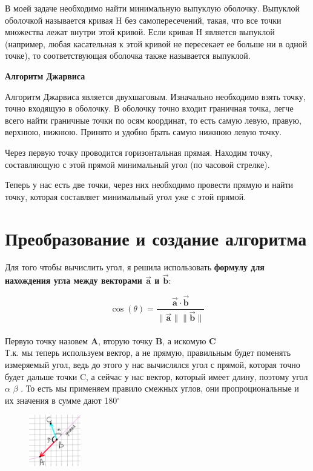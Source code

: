 \documentclass[a4paper]{article}
\begin{document}
\hspace{0.5cm} В моей задаче необходимо найти минимальную выпуклую оболочку. Выпуклой оболочкой называется кривая H без самопересечений, такая, что все точки множества лежат внутри этой кривой. Если кривая H является выпуклой (например, любая касательная к этой кривой не пересекает ее больше ни в одной точке), то соответствующая оболочка также называется выпуклой.

\textbf{Алгоритм Джарвиса}

Алгоритм Джарвиса является двухшаговым. Изначально необходимо взять точку, точно входящую в оболочку. В оболочку точно входит граничная точка, легче всего найти граничные точки по осям координат, то есть самую левую, правую, верхнюю, нижнюю. Принято и удобно брать самую нижнюю левую точку.

Через первую точку проводится горизонтальная прямая. Находим точку, составляющую с этой прямой минимальный угол (по часовой стрелке).

Теперь у нас есть две точки, через них необходимо провести прямую и найти точку, которая составляет минимальный угол уже с этой прямой.


\section{Преобразование и создание алгоритма}
\hspace{1cm}Для того чтобы вычислить угол, я решила использовать \textbf{формулу для нахождения угла между векторами \(\mathbf{\vec{a}}\) и \(\mathbf{\vec{b}}\)}:

\[
\cos(\theta) = \frac{\mathbf{\vec{a}} \cdot \mathbf{\vec{b}}}{\|\mathbf{\vec{a}}\| \|\mathbf{\vec{b}}\|}
\]
\\
Первую точку назовем \textbf{A}, вторую точку \textbf{B}, а искомую \textbf{C}\\
Т.к. мы теперь используем вектор, а не прямую, правильным будет поменять измеряемый угол, ведь до этого у нас вычислялся угол с прямой, которая точно будет дальше точки C, а сейчас у нас вектор, который имеет длину, поэтому угол $\alpha$  $\beta$ . То есть мы применяем правило смежных углов, они пропроциональные и их значения в сумме дают 180$^\circ$


\begin{figure}[h] %
    \centering %
    \includegraphics[width=0.2\textwidth]{image1.png} %
    \caption{} %
    \label{fig:example} %
\end{figure}
\end{document}
